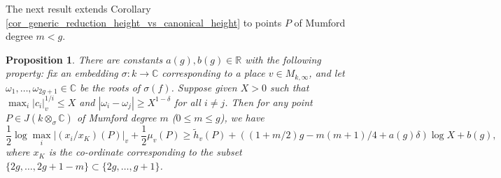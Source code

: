 \documentclass{article} %
\newtheorem{proposition}{Proposition}[section]
\numberwithin{equation}{section}
\newcommand{\R}{\mathbb{R}}
\newcommand{\bC}{\mathbb{C}}
\begin{document}
The next result extends Corollary \ref{cor_generic_reduction_height_vs_canonical_height} to points $P$ of Mumford degree $m < g$.
\begin{proposition}\label{prop_general_reduction_height_vs_canonical_height}
    There are constants $a(g), b(g) \in \R$ with the following property: fix an embedding $\sigma : k \to \bC$ corresponding to a place $v \in M_{k, \infty}$, and let $\omega_1, \dots, \omega_{2g+1} \in \bC$ be the roots of $\sigma(f)$. Suppose given $X > 0$ such that $\max_i | c_i |_v^{1/i} \leq X$ and $|\omega_i - \omega_j| \geq X^{1-\delta}$ for all $i \neq j$. Then for any point $P \in J(k \otimes_\sigma \bC)$ of Mumford degree $m$ ($0 \leq m \leq g$), we have
\[  \frac{1}{2} \log \max_i | (x_i / x_K)(P) |_v + \frac{1}{2} \mu_v(P) \geq \widetilde{h}_v(P) + ((1 + m/2) g - m(m+1)/4 + a(g) \delta) \log X + b(g),  \]
where $x_K$ is the co-ordinate corresponding to the subset $\{ 2g, \dots, 2g+1-m \} \subset \{ 2g, \dots, g+1\}$.
\end{proposition}
\end{document}

